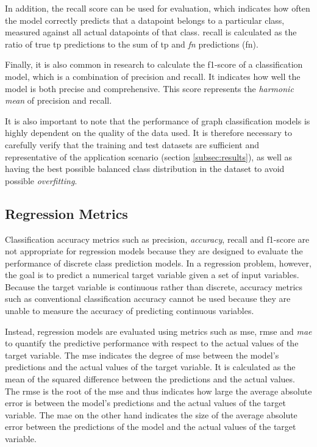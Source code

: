 \documentclass[a4paper, 12pt]{report}
\begin{document}
In addition, the \gls{recall} score can be used for evaluation, which indicates how often the model correctly predicts that a datapoint belongs to a particular class, measured against all actual datapoints of that class. \Gls{recall} is calculated as the ratio of true \acrshort{tp} predictions to the sum of \acrshort{tp} and \textit{\acrlong{fn}} predictions (\acrshort{fn}).

Finally, it is also common in research to calculate the \gls{f1-score} of a classification model, which is a combination of \gls{precision} and \gls{recall}. It indicates how well the model is both precise and comprehensive. This score represents the \textit{harmonic mean} of \gls{precision} and \gls{recall}.

It is also important to note that the performance of graph classification models is highly dependent on the quality of the data used. It is therefore necessary to carefully verify that the training and test datasets are sufficient and representative of the application scenario (section \ref{subsec:results}), as well as having the best possible balanced class distribution in the dataset to avoid possible \textit{\gls{overfitting}}.

\subsection{Regression Metrics}\label{subsec:regression-metrics}

Classification accuracy metrics such as \gls{precision}, \textit{accuracy}, \gls{recall} and \gls{f1-score} are not appropriate for regression models because they are designed to evaluate the performance of discrete class prediction models. In a regression problem, however, the goal is to predict a numerical target variable given a set of input variables. Because the target variable is continuous rather than discrete, accuracy metrics such as conventional classification accuracy cannot be used because they are unable to measure the accuracy of predicting continuous variables.

Instead, regression models are evaluated using metrics such as \acrfull{mse}, \acrfull{rmse} and \textit{\acrfull{mae}} to quantify the predictive performance with respect to the actual values of the target variable. The \acrshort{mse} indicates the degree of \acrlong{mse} between the model's predictions and the actual values of the target variable. It is calculated as the mean of the squared difference between the predictions and the actual values. The \acrshort{rmse} is the root of the \acrshort{mse} and thus indicates how large the average absolute error is between the model's predictions and the actual values of the target variable. The \acrshort{mae} on the other hand indicates the size of the average absolute error between the predictions of the model and the actual values of the target variable.
\end{document}

